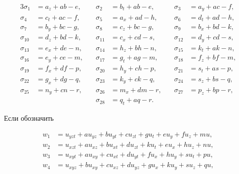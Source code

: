 \begin{alignat*}{3}


\sigma_{1}&=a_{z}+ab-e,&\quad \sigma_{2}&=b_{t}+ab-e,&\quad


\sigma_{3}&=a_{y}+ac-f,\\


\sigma_{4}&=c_{t}+ac-f,&\quad \sigma_{5}&=a_{x}+ad-h,&\quad


\sigma_{6}&=d_{t}+ad-h,\\


\sigma_{7}&=b_{y}+bc-g,&\quad \sigma_{8}&=c_{z}+bc-g,&\quad


\sigma_{9}&=b_{x}+bd-k,\\


\sigma_{10}&=d_{z}+bd-k,&\quad \sigma_{11}&=c_{x}+cd-s,&\quad


\sigma_{12}&=d_{y}+cd-s,\\


\sigma_{13}&=e_{x}+de-n,&\quad \sigma_{14}&=h_{z}+bh-n,&\quad


\sigma_{15}&=k_{t}+ak-n,\\


\sigma_{16}&=e_{y}+ce-m,&\quad \sigma_{17}&=g_{t}+ag-m,&\quad


\sigma_{18}&=f_{z}+bf-m,\\


\sigma_{19}&=f_{x}+df-p,&\quad \sigma_{20}&=h_{y}+ch-p,&\quad


\sigma_{21}&=s_{t}+as-p,\\


\sigma_{22}&=g_{x}+dg-q,&\quad \sigma_{23}&=k_{y}+ck-q,&\quad


\sigma_{24}&=s_{z}+bs-q,\\


\sigma_{25}&=n_{y}+cn-r,&\quad \sigma_{26}&=m_{x}+dm-r,&\quad


\sigma_{27}&=p_{z}+bp-r,\\


& \ &\quad \sigma_{28}&=q_{t}+aq-r. &\quad & \


\end{alignat*}


Если обозначить


\begin{equation}\label{30}


\begin{split}


w_{1}&=u_{yzt}+au_{yz}+bu_{yt}+cu_{zt}+gu_{t}+eu_{y}+fu_{z}+mu,\\


w_{2}&=u_{xzt}+au_{xz}+bu_{xt}+du_{zt}+ku_{t}+eu_{x}+hu_{z}+nu,\\


w_{3}&=u_{xyt}+au_{xy}+cu_{xt}+du_{yt}+fu_{x}+hu_{y}+su_{t}+pu,\\


w_{4}&=u_{xyz}+bu_{xy}+cu_{xz}+du_{yz}+gu_{x}+ku_{y}+su_{z}+qu,


\end{split}


\end{equation}


